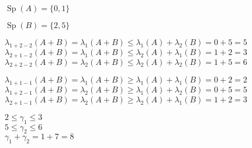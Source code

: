 \documentclass[letterpaper,12pt,fleqn]{article}
\newcommand{\g}{\gamma}
\renewcommand{\l}{\lambda}
\DeclareMathOperator{\Sp}{Sp}
\begin{document}
\begin{example}
  $\Sp(A)=\{0,1\}$

  $\Sp(B)=\{2,5\}$

  $\l_{1+2-2}(A+B)=\l_1(A+B)\le\l_1(A)+\l_2(B)=0+5=5$ \\
  $\l_{2+1-2}(A+B)=\l_1(A+B)\le\l_2(A)+\l_1(B)=1+2=3$ \\
  $\l_{2+2-2}(A+B)=\l_2(A+B)\le\l_2(A)+\l_2(B)=1+5=6$

  $\l_{1+1-1}(A+B)=\l_1(A+B)\ge\l_1(A)+\l_1(B)=0+2=2$ \\
  $\l_{1+2-1}(A+B)=\l_2(A+B)\ge\l_1(A)+\l_2(B)=0+5=5$ \\
  $\l_{2+1-1}(A+B)=\l_2(A+B)\ge\l_2(A)+\l_1(B)=1+2=3$

  $2\le\g_1\le3$ \\
  $5\le\g_2\le6$ \\
  $\g_1+\g_2=1+7=8$
\end{example}
\end{document}
